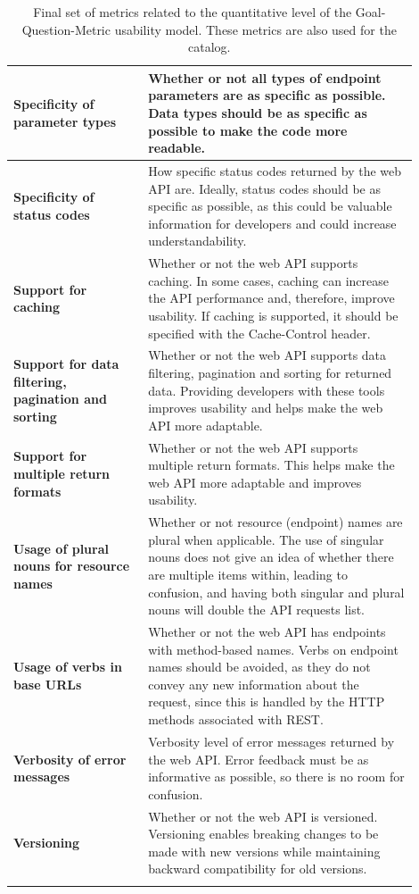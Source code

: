 \documentclass[12pt]{article}
\begin{document}
\begin{center}
{\begin{longtable}{p{0.3\linewidth}p{0.6\linewidth}}
			\hline
			\textbf{Specificity of parameter types} & Whether or not all types of endpoint parameters are as specific as possible. Data types should be as specific as possible to make the code more readable.\\
			\hline
			\textbf{Specificity of status codes} & How specific status codes returned by the web API are. Ideally, status codes should be as specific as possible, as this could be valuable information for developers and could increase understandability.\\
			\hline
			\textbf{Support for caching} & Whether or not the web API supports caching. In some cases, caching can increase the API performance and, therefore, improve usability. If caching is supported, it should be specified with the Cache-Control header.\\
			\hline
			\textbf{Support for data filtering, pagination and sorting} & Whether or not the web API supports data filtering, pagination and sorting for returned data. Providing developers with these tools improves usability and helps make the web API more adaptable.\\
			\hline
			\textbf{Support for multiple return formats} & Whether or not the web API supports multiple return formats. This helps make the web API more adaptable and improves usability.\\
			\hline
			\textbf{Usage of plural nouns for resource names} & Whether or not resource (endpoint) names are plural when applicable. The use of singular nouns does not give an idea of whether there are multiple items within, leading to confusion, and having both singular and plural nouns will double the API requests list.\\
			\hline
			\textbf{Usage of verbs in base URLs} & Whether or not the web API has endpoints with method-based names. Verbs on endpoint names should be avoided, as they do not convey any new information about the request, since this is handled by the HTTP methods associated with REST.\\
			\hline
			\textbf{Verbosity of error messages} & Verbosity level of error messages returned by the web API. Error feedback must be as informative as possible, so there is no room for confusion.\\
			\hline
			\textbf{Versioning} & Whether or not the web API is versioned. Versioning enables breaking changes to be made with new versions while maintaining backward compatibility for old versions.\\
			\hline
			
			\caption{Final set of metrics related to the quantitative level of the \mbox{Goal-Question-Metric} usability model. These metrics are also used for the catalog.}
			\label{tab:Metrics}
		\end{longtable}}
	\end{center}
	
\end{document}
